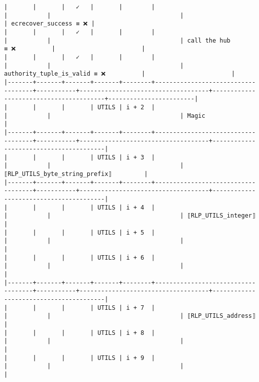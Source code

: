 \documentclass[varwidth=\maxdimen,margin=0.5cm,multi={verbatim}]{standalone}
\begin{document}
\begin{verbatim}
|       |       |   ✓   |       |        |                                    |           |                                    |                                        | ecrecover_success ≡ ❌ |
|       |       |   ✓   |       |        |                                    |           |                                    | call the hub             ≡ ❌          |                        |
|       |       |   ✓   |       |        |                                    |           |                                    | authority_tuple_is_valid ≡ ❌          |                        |
|-------+-------+-------+-------+--------+------------------------------------+-----------+------------------------------------+----------------------------------------+------------------------|
|       |       |       | UTILS | i + 2  |                                    |           |                                    | Magic                                  |
|-------+-------+-------+-------+--------+------------------------------------+-----------+------------------------------------+----------------------------------------|
|       |       |       | UTILS | i + 3  |                                    |           |                                    | ⟦RLP_UTILS_byte_string_prefix⟧         |
|-------+-------+-------+-------+--------+------------------------------------+-----------+------------------------------------+----------------------------------------|
|       |       |       | UTILS | i + 4  |                                    |           |                                    | ⟦RLP_UTILS_integer⟧                    |
|       |       |       | UTILS | i + 5  |                                    |           |                                    |                                        |
|       |       |       | UTILS | i + 6  |                                    |           |                                    |                                        |
|-------+-------+-------+-------+--------+------------------------------------+-----------+------------------------------------+----------------------------------------|
|       |       |       | UTILS | i + 7  |                                    |           |                                    | ⟦RLP_UTILS_address⟧                    |
|       |       |       | UTILS | i + 8  |                                    |           |                                    |                                        |
|       |       |       | UTILS | i + 9  |                                    |           |                                    |                                        |

\end{verbatim}
\end{document}
